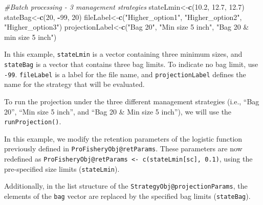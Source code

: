 \documentclass[
]{book}
\newenvironment{Shaded}{\begin{snugshade}}{\end{snugshade}}
\newcommand{\CommentTok}[1]{\textcolor[rgb]{0.56,0.35,0.01}{\textit{#1}}}
\newcommand{\DecValTok}[1]{\textcolor[rgb]{0.00,0.00,0.81}{#1}}
\newcommand{\FloatTok}[1]{\textcolor[rgb]{0.00,0.00,0.81}{#1}}
\newcommand{\FunctionTok}[1]{\textcolor[rgb]{0.13,0.29,0.53}{\textbf{#1}}}
\newcommand{\NormalTok}[1]{#1}
\newcommand{\OtherTok}[1]{\textcolor[rgb]{0.56,0.35,0.01}{#1}}
\newcommand{\SpecialCharTok}[1]{\textcolor[rgb]{0.81,0.36,0.00}{\textbf{#1}}}
\newcommand{\StringTok}[1]{\textcolor[rgb]{0.31,0.60,0.02}{#1}}
\begin{document}
\begin{Shaded}
\begin{Highlighting}[]
\CommentTok{\#Batch processing {-} 3 management strategies}
\NormalTok{stateLmin}\OtherTok{\textless{}{-}}\FunctionTok{c}\NormalTok{(}\FloatTok{10.2}\NormalTok{, }\FloatTok{12.7}\NormalTok{,  }\FloatTok{12.7}\NormalTok{)}
\NormalTok{stateBag}\OtherTok{\textless{}{-}}\FunctionTok{c}\NormalTok{(}\DecValTok{20}\NormalTok{, }\SpecialCharTok{{-}}\DecValTok{99}\NormalTok{, }\DecValTok{20}\NormalTok{)}
\NormalTok{fileLabel}\OtherTok{\textless{}{-}}\FunctionTok{c}\NormalTok{(}\StringTok{"Higher\_option1"}\NormalTok{, }\StringTok{"Higher\_option2"}\NormalTok{, }\StringTok{"Higher\_option3"}\NormalTok{)}
\NormalTok{projectionLabel}\OtherTok{\textless{}{-}}\FunctionTok{c}\NormalTok{(}\StringTok{"Bag 20"}\NormalTok{, }\StringTok{"Min size 5 inch"}\NormalTok{, }\StringTok{"Bag 20 \& min size 5 inch"}\NormalTok{)}
\end{Highlighting}
\end{Shaded}

In this example, \texttt{stateLmin} is a vector containing three minimum sizes, and \texttt{stateBag} is a vector that contains three bag limits. To indicate no bag limit, use \texttt{-99}. \texttt{fileLabel} is a label for the file name, and \texttt{projectionLabel} defines the name for the strategy that will be evaluated.

To run the projection under the three different management strategies (i.e., ``Bag 20'', ``Min size 5 inch'', and ``Bag 20 \& Min size 5 inch''), we will use the \texttt{runProjection()}.

In this example, we modify the retention parameters of the logistic function previously defined in \texttt{ProFisheryObj@retParams}. These parameters are now redefined as \texttt{ProFisheryObj@retParams\ \textless{}-\ c(stateLmin{[}sc{]},\ 0.1)}, using the pre-specified size limits (\texttt{stateLmin}).

Additionally, in the list structure of the \texttt{StrategyObj@projectionParams}, the elements of the \texttt{bag} vector are replaced by the specified bag limits (\texttt{stateBag}).
\end{document}

